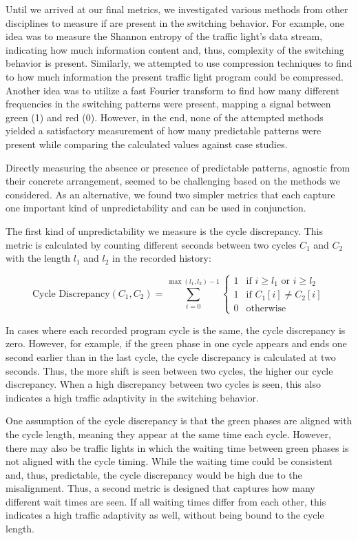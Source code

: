 Until we arrived at our final metrics, we investigated various methods from other disciplines to measure if are present in the switching behavior. For example, one idea was to measure the Shannon entropy of the traffic light's data stream, indicating how much information content and, thus, complexity of the switching behavior is present. Similarly, we attempted to use compression techniques to find to how much information the present traffic light program could be compressed. Another idea was to utilize a fast Fourier transform to find how many different frequencies in the switching patterns were present, mapping a signal between green (1) and red (0). However, in the end, none of the attempted methods yielded a satisfactory measurement of how many predictable patterns were present while comparing the calculated values against case studies. 

Directly measuring the absence or presence of predictable patterns, agnostic from their concrete arrangement, seemed to be challenging based on the methods we considered. As an alternative, we found two simpler metrics that each capture one important kind of unpredictability and can be used in conjunction.

The first kind of unpredictability we measure is the cycle discrepancy. This metric is calculated by counting different seconds between two cycles $C_1$ and $C_2$ with the length $l_1$ and $l_2$ in the recorded history:

\begin{equation} \text{Cycle Discrepancy}(C_1, C_2) =  \sum_{i=0}^{\max(l_1, l_2)-1} \left\{
\begin{array}{ll}
1 & \text{if } i \geq l_1 \text{ or } i \geq l_2 \\
1 & \text{if } C_1[i] \neq C_2[i] \\
0 & \text{otherwise}
\end{array} \right.\end{equation}

In cases where each recorded program cycle is the same, the cycle discrepancy is zero. However, for example, if the green phase in one cycle appears and ends one second earlier than in the last cycle, the cycle discrepancy is calculated at two seconds. Thus, the more shift is seen between two cycles, the higher our cycle discrepancy. When a high discrepancy between two cycles is seen, this also indicates a high traffic adaptivity in the switching behavior.

One assumption of the cycle discrepancy is that the green phases are aligned with the cycle length, meaning they appear at the same time each cycle. However, there may also be traffic lights in which the waiting time between green phases is not aligned with the cycle timing. While the waiting time could be consistent and, thus, predictable, the cycle discrepancy would be high due to the misalignment. Thus, a second metric is designed that captures how many different wait times are seen. If all waiting times differ from each other, this indicates a high traffic adaptivity as well, without being bound to the cycle length.

